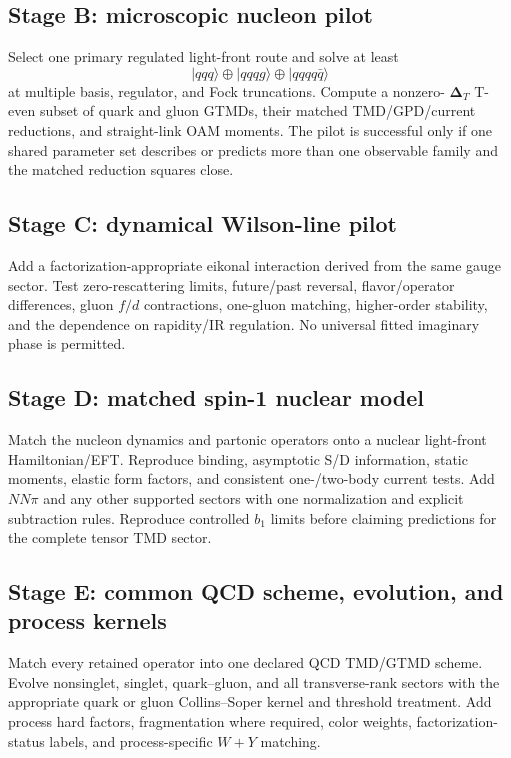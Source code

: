 \documentclass[11pt]{article}
\newcommand{\DT}{\bm{\Delta}_{T}}
\begin{document}
\subsection{Stage B: microscopic nucleon pilot}

Select one primary regulated light-front route and solve at least
\begin{equation}
 |qqq\rangle\oplus|qqqg\rangle\oplus|qqqq\bar q\rangle
\end{equation}
at multiple basis, regulator, and Fock truncations.  Compute a nonzero-
\(\DT\) T-even subset of quark and gluon GTMDs, their matched TMD/GPD/current
reductions, and straight-link OAM moments.  The pilot is successful only if
one shared parameter set describes or predicts more than one observable
family and the matched reduction squares close.

\subsection{Stage C: dynamical Wilson-line pilot}

Add a factorization-appropriate eikonal interaction derived from the same
gauge sector.  Test zero-rescattering limits, future/past reversal,
flavor/operator differences, gluon \(f/d\) contractions, one-gluon matching,
higher-order stability, and the dependence on rapidity/IR regulation.  No
universal fitted imaginary phase is permitted.

\subsection{Stage D: matched spin-1 nuclear model}

Match the nucleon dynamics and partonic operators onto a nuclear light-front
Hamiltonian/EFT.  Reproduce binding, asymptotic S/D information, static
moments, elastic form factors, and consistent one-/two-body current tests.
Add \(NN\pi\) and any other supported sectors with one normalization and
explicit subtraction rules.  Reproduce controlled \(b_1\) limits before
claiming predictions for the complete tensor TMD sector.

\subsection{Stage E: common QCD scheme, evolution, and process kernels}

Match every retained operator into one declared QCD TMD/GTMD scheme.  Evolve
nonsinglet, singlet, quark--gluon, and all transverse-rank sectors with the
appropriate quark or gluon Collins--Soper kernel and threshold treatment.
Add process hard factors, fragmentation where required, color weights,
factorization-status labels, and process-specific \(W+Y\) matching.
\end{document}
